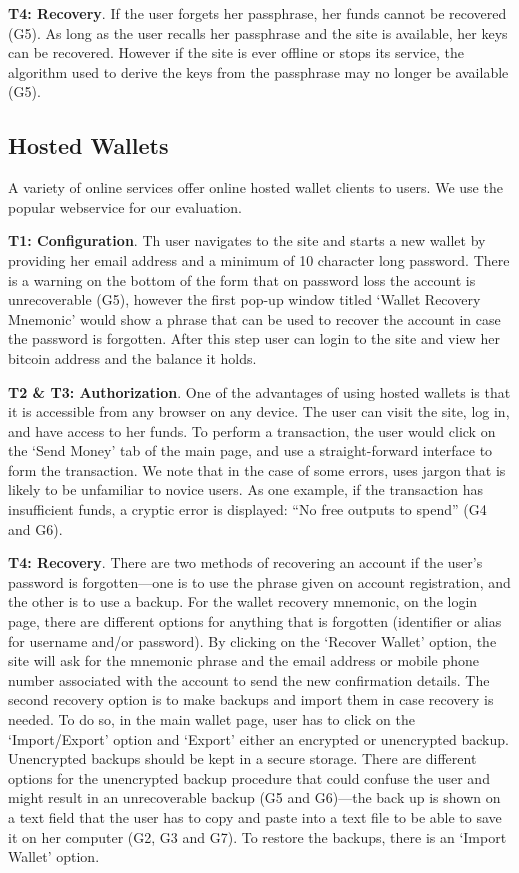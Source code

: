 \textbf{T4: Recovery}.
If the user forgets her passphrase, her funds cannot be recovered (G5). As long as the user recalls her passphrase and the \brain site is available, her keys can be recovered. However if the site is ever offline or stops its service, the algorithm used to derive the keys from the passphrase may no longer be available (G5).

\subsection{Hosted Wallets}
\label{hosted}
A variety of online services offer online hosted wallet clients to users. We use the popular \block webservice for our evaluation.

\textbf{T1: Configuration}.
Th user navigates to the \block site and starts a new wallet by providing her email address and a minimum of 10 character long password. There is a warning on the bottom of the form that on password loss the account is unrecoverable (G5), however the first pop-up window titled `Wallet Recovery Mnemonic' would show a phrase that can be used to recover the account in case the password is forgotten. After this step user can login to the site and view her bitcoin address and the balance it holds.

\textbf{T2 \& T3: Authorization}.
\label{hosted transaction}
One of the advantages of using hosted wallets is that it is accessible from any browser on any device. The user can visit the site, log in, and have access to her funds. To perform a transaction, the user would click on the `Send Money' tab of the main page, and use a straight-forward interface to form the transaction. We note that in the case of some errors, \block uses jargon that is likely to be unfamiliar to novice users. As one example, if the transaction has insufficient funds, a cryptic error is displayed: ``No free outputs to spend'' (G4 and G6).

\textbf{T4: Recovery}.
There are two methods of recovering an account if the user's password is forgotten---one is to use the phrase given on account registration, and the other is to use a backup. For the wallet recovery mnemonic, on the login page, there are different options for anything that is forgotten (identifier or alias for username and/or password). By clicking on the `Recover Wallet' option, the site will ask for the mnemonic phrase and the email address or mobile phone number associated with the account to send the new confirmation details. The second recovery option is to make backups and import them in case recovery is needed. To do so, in the main wallet page, user has to click on the `Import/Export' option and `Export' either an encrypted or unencrypted backup. Unencrypted backups should be kept in a secure storage. There are different options for the unencrypted backup procedure that could confuse the user and might result in an unrecoverable backup (G5 and G6)---the back up is shown on a text field that the user has to copy and paste into a text file to be able to save it on her computer (G2, G3 and G7). To restore the backups, there is an `Import Wallet' option.


